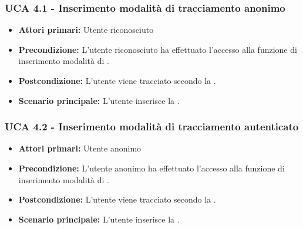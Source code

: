 \subsubsection{UCA 4.1 - Inserimento modalità di tracciamento anonimo}%
\begin{itemize}
	\item \textbf{Attori primari:} Utente riconosciuto
	\item \textbf{Precondizione:} L'utente riconosciuto ha effettuato l'accesso alla funzione di inserimento modalità di .
	\item \textbf{Postcondizione:} L'utente viene tracciato secondo la .
	\item \textbf{Scenario principale:} L'utente inserisce la .
\end{itemize}

\subsubsection{UCA 4.2 - Inserimento modalità di tracciamento autenticato}%
\begin{itemize}
	\item \textbf{Attori primari:} Utente anonimo
	\item \textbf{Precondizione:} L'utente anonimo ha effettuato l'accesso alla funzione di inserimento modalità di .
	\item \textbf{Postcondizione:} L'utente viene tracciato secondo la .
	\item \textbf{Scenario principale:} L'utente inserisce la .
\end{itemize}
